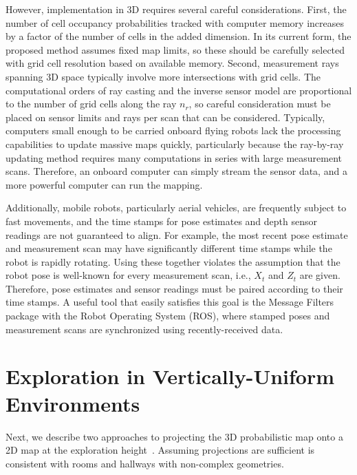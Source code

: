 However, implementation in 3D requires several careful considerations. First, the number of cell occupancy probabilities tracked with computer memory increases by a factor of the number of cells in the added dimension. In its current form, the proposed method assumes fixed map limits, so these should be carefully selected with grid cell resolution based on available memory. Second, measurement rays spanning 3D space typically involve more intersections with grid cells. The computational orders of ray casting and the inverse sensor model are proportional to the number of grid cells along the ray $n_r$, so careful consideration must be placed on sensor limits and rays per scan that can be considered. Typically, computers small enough to be carried onboard flying robots lack the processing capabilities to update massive maps quickly, particularly because the ray-by-ray updating method requires many computations in series with large measurement scans. Therefore, an onboard computer can simply stream the sensor data, and a more powerful computer can run the mapping.

Additionally, mobile robots, particularly aerial vehicles, are frequently subject to fast movements, and the time stamps for pose estimates and depth sensor readings are not guaranteed to align. For example, the most recent pose estimate and measurement scan may have significantly different time stamps while the robot is rapidly rotating. Using these together violates the assumption that the robot pose is well-known for every measurement scan, i.e., $X_t$ and $Z_t$ are given. Therefore, pose estimates and sensor readings must be paired according to their time stamps. A useful tool that easily satisfies this goal is the Message Filters package with the Robot Operating System (ROS), where stamped poses and measurement scans are synchronized using recently-received data.

\section{Exploration in Vertically-Uniform Environments}
\label{sec:MapProjections}

Next, we describe two approaches to projecting the 3D probabilistic map onto a 2D map at the exploration height~\cite{KauTakAiLee18}. Assuming projections are sufficient is consistent with rooms and hallways with non-complex geometries.

